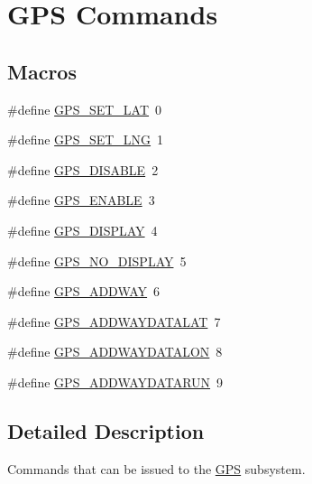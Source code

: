 \hypertarget{group__gps__commands}{\section{G\-P\-S Commands}
\label{group__gps__commands}
}
\subsection*{Macros}
\begin{DoxyCompactItemize}
\item 
\#define \hyperlink{group__gps__commands_gaac31d4fc4681381604fdbf78b5aa7599}{G\-P\-S\-\_\-\-S\-E\-T\-\_\-\-L\-A\-T}~0
\item 
\#define \hyperlink{group__gps__commands_gafe7ed49e1848a16fd15d1643b4c4c36b}{G\-P\-S\-\_\-\-S\-E\-T\-\_\-\-L\-N\-G}~1
\item 
\#define \hyperlink{group__gps__commands_ga8e394314aacedb0790203d4af6cd5710}{G\-P\-S\-\_\-\-D\-I\-S\-A\-B\-L\-E}~2
\item 
\#define \hyperlink{group__gps__commands_gac8383d8fc4fa97bb45f89d9a50e0966d}{G\-P\-S\-\_\-\-E\-N\-A\-B\-L\-E}~3
\item 
\#define \hyperlink{group__gps__commands_gad25ca4dcc3aa69da0e474e3b69cc910a}{G\-P\-S\-\_\-\-D\-I\-S\-P\-L\-A\-Y}~4
\item 
\#define \hyperlink{group__gps__commands_ga3de45ac0f8b80c8044b533d47cf08e99}{G\-P\-S\-\_\-\-N\-O\-\_\-\-D\-I\-S\-P\-L\-A\-Y}~5
\item 
\#define \hyperlink{group__gps__commands_ga8fea9a175c11935b9e7cc3e2857621aa}{G\-P\-S\-\_\-\-A\-D\-D\-W\-A\-Y}~6
\item 
\#define \hyperlink{group__gps__commands_gae6a303b17a88ef3e34cf8e3caf8f7a52}{G\-P\-S\-\_\-\-A\-D\-D\-W\-A\-Y\-D\-A\-T\-A\-L\-A\-T}~7
\item 
\#define \hyperlink{group__gps__commands_ga0d500f7c6ef80090a0c8928e4d7e0f59}{G\-P\-S\-\_\-\-A\-D\-D\-W\-A\-Y\-D\-A\-T\-A\-L\-O\-N}~8
\item 
\#define \hyperlink{group__gps__commands_ga9a0958ce7693698b1bb24e54413819ed}{G\-P\-S\-\_\-\-A\-D\-D\-W\-A\-Y\-D\-A\-T\-A\-R\-U\-N}~9
\end{DoxyCompactItemize}


\subsection{Detailed Description}
Commands that can be issued to the \hyperlink{classGPS}{G\-P\-S} subsystem. 

